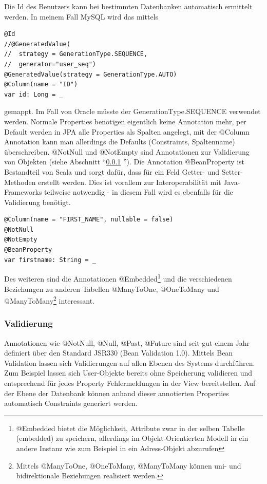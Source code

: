 Die Id des Benutzers kann bei bestimmten Datenbanken automatisch ermittelt werden. In meinem Fall MySQL wird das mittels 
\begin{lstlisting}[caption=User: ScalaJPA Id mit Auto-Increment]
@Id
//@GeneratedValue(
//	strategy = GenerationType.SEQUENCE, 
//	generator="user_seq")
@GeneratedValue(strategy = GenerationType.AUTO)
@Column(name = "ID")
var id: Long = _
\end{lstlisting}
gemappt. Im Fall von Oracle m\"usste der GenerationType.SEQUENCE verwendet werden.
Normale Properties ben\"otigen eigentlich keine Annotation mehr, per Default werden in JPA alle Properties als Spalten angelegt, mit der @Column Annotation kann man allerdings die Defaults (Constraints, Spaltenname) \"uberschreiben. @NotNull und @NotEmpty sind Annotationen zur Validierung von Objekten (siehe Abschnitt ``\ref{jpa:validation} ''). Die Annotation @BeanProperty ist Bestandteil von Scala und sorgt daf\"ur, dass f\"ur ein Feld Getter- und Setter-Methoden erstellt werden. Dies ist vorallem zur Interoperabilit\"at mit Java-Frameworks teilweise notwendig - in diesem Fall wird es ebenfalls f\"ur die Validierung ben\"otigt. 
\begin{lstlisting}[caption=User: ScalaJPA firstname Mapping]
@Column(name = "FIRST_NAME", nullable = false)
@NotNull
@NotEmpty
@BeanProperty
var firstname: String = _
\end{lstlisting}

Des weiteren sind die Annotationen @Embedded\footnote{@Embedded bietet die M\"oglichkeit, Attribute zwar in der selben Tabelle (embedded) zu speichern, allerdings im Objekt-Orientierten Modell in ein andere Instanz wie zum Beispiel in ein Adress-Objekt abzurufen} und die verschiedenen Beziehungen zu anderen Tabellen @ManyToOne, @OneToMany und @ManyToMany\footnote{Mittels @ManyToOne, @OneToMany, @ManyToMany k\"onnen uni- und bidirektionale Beziehungen realisiert werden.} interessant. 



\subsubsection{Validierung}\label{jpa:validation}
Annotationen wie @NotNull, @Null, @Past, @Future sind seit gut einem Jahr definiert \"uber den Standard JSR330 (Bean Validation 1.0). Mittels Bean Validation lassen sich Validierungen auf allen Ebenen des Systems durchf\"uhren. Zum Beispiel lassen sich User-Objekte bereits ohne Speicherung validieren und entsprechend f\"ur jedes Property Fehlermeldungen in der View bereitstellen. Auf der Ebene der Datenbank k\"onnen anhand dieser annotierten Properties automatisch Constraints  generiert werden.

